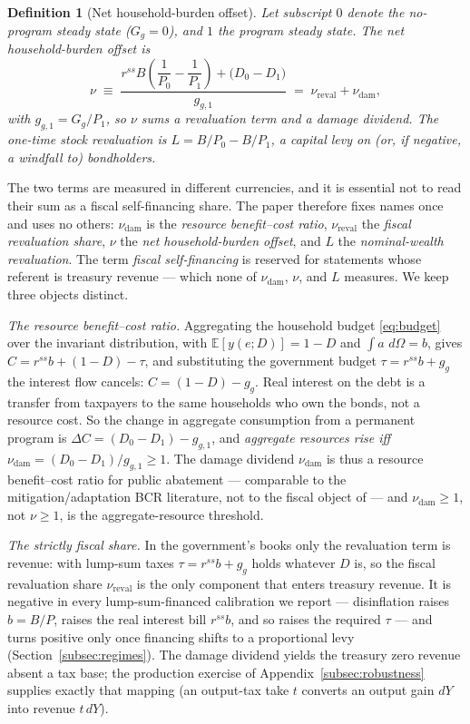 \documentclass[12pt]{article}
\newtheorem{definition}{Definition}
\newcommand{\E}{\mathbb{E}}
\newcommand{\dd}{\,d}
\begin{document}
\begin{definition}[Net household-burden offset]\label{def:nu}
Let subscript $0$ denote the no-program steady state ($G_g=0$), and $1$ the
program steady state. The net household-burden offset is
\begin{equation}
\nu \;\equiv\; \frac{r^{ss}B\left(\dfrac{1}{P_0}-\dfrac{1}{P_1}\right)
+ \big(D_0 - D_1\big)}{g_{g,1}}
\;=\; \nu_{\mathrm{reval}} + \nu_{\mathrm{dam}},
\label{eq:nu}
\end{equation}
with $g_{g,1}=G_g/P_1$, so $\nu$ sums a revaluation term and a
damage dividend. The one-time stock revaluation is
$L = B/P_0 - B/P_1$, a capital levy on (or, if negative, a windfall to)
bondholders.
\end{definition}

The two terms are measured in different currencies, and it is essential not
to read their sum as a fiscal self-financing share. The paper therefore fixes
names once and uses no others: $\nu_{\mathrm{dam}}$ is the \emph{resource
benefit--cost ratio}, $\nu_{\mathrm{reval}}$ the \emph{fiscal revaluation
share}, $\nu$ the \emph{net household-burden offset}, and $L$ the
\emph{nominal-wealth revaluation}. The term \emph{fiscal self-financing} is
reserved for statements whose referent is treasury revenue --- which none of
$\nu_{\mathrm{dam}}$, $\nu$, and $L$ measures. We keep
three objects distinct.

\emph{The resource benefit--cost ratio.} Aggregating the household budget
\eqref{eq:budget} over the invariant distribution, with $\E[y(e;D)]=1-D$
and $\int a\,\dd\Omega=b$, gives $C = r^{ss}b + (1-D) - \tau$, and
substituting the government budget $\tau=r^{ss}b+g_g$ the interest flow
cancels: $C = (1-D) - g_g$. Real interest on the debt is a transfer from
taxpayers to the same households who own the bonds, not a resource cost. So
the change in aggregate consumption from a permanent program is
$\Delta C = (D_0-D_1) - g_{g,1}$, and \emph{aggregate resources rise iff}
$\nu_{\mathrm{dam}}=(D_0-D_1)/g_{g,1}\ge1$. The damage dividend
$\nu_{\mathrm{dam}}$ is thus a resource benefit--cost ratio for public
abatement --- comparable to the mitigation/adaptation BCR literature, not to
the fiscal object of \citet{angeletos2024deficits} --- and $\nu_{\mathrm{dam}}\ge1$,
not $\nu\ge1$, is the aggregate-resource threshold.

\emph{The strictly fiscal share.} In the government's books only the
revaluation term is revenue: with lump-sum taxes $\tau=r^{ss}b+g_g$ holds
whatever $D$ is, so the fiscal revaluation share $\nu_{\mathrm{reval}}$ is the
only component that enters treasury revenue. It is negative in every lump-sum-financed calibration we report
--- disinflation raises $b=B/P$, raises the real interest bill $r^{ss}b$, and
so raises the required $\tau$ --- and turns positive only once financing
shifts to a proportional levy (Section~\ref{subsec:regimes}). The damage
dividend yields the treasury zero revenue absent a tax base; the production
exercise of Appendix~\ref{subsec:robustness} supplies exactly that mapping
(an output-tax take $t$ converts an output gain $dY$ into revenue $t\,dY$).
\end{document}
